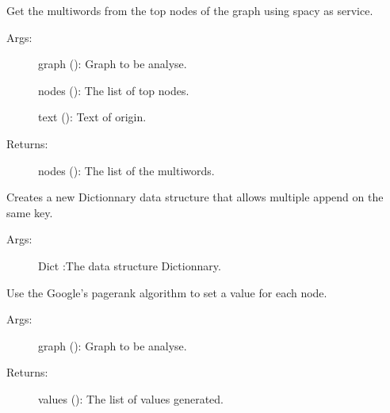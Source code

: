 \documentclass[letterpaper,10pt,english]{sphinxmanual}
\begin{document}
\begin{fulllineitems}
\label{\detokenize{keywords:keywords.Concatenate_candidates_spacy}}
Get the multiwords from the top nodes of the graph using spacy as service.
\begin{description}
\item[{Args:}] \leavevmode
graph (): Graph to be analyse.

nodes (): The list of top nodes.

text (): Text of origin.

\item[{Returns:}] \leavevmode
nodes (): The list of the multiwords.

\end{description}

\end{fulllineitems}


\begin{fulllineitems}
\label{\detokenize{keywords:keywords.OrderedDict}}

Creates a new Dictionnary data structure that allows multiple append on the same key.
\begin{description}
\item[{Args:}] \leavevmode
Dict :The data structure Dictionnary.

\end{description}

\end{fulllineitems}


\begin{fulllineitems}
\label{\detokenize{keywords:keywords.Pagerank}}
Use the Google’s pagerank algorithm  to set a value for each node.
\begin{description}
\item[{Args:}] \leavevmode
graph (): Graph to be analyse.

\item[{Returns:}] \leavevmode
values (): The list of values generated.

\end{description}

\end{fulllineitems}
\end{document}
